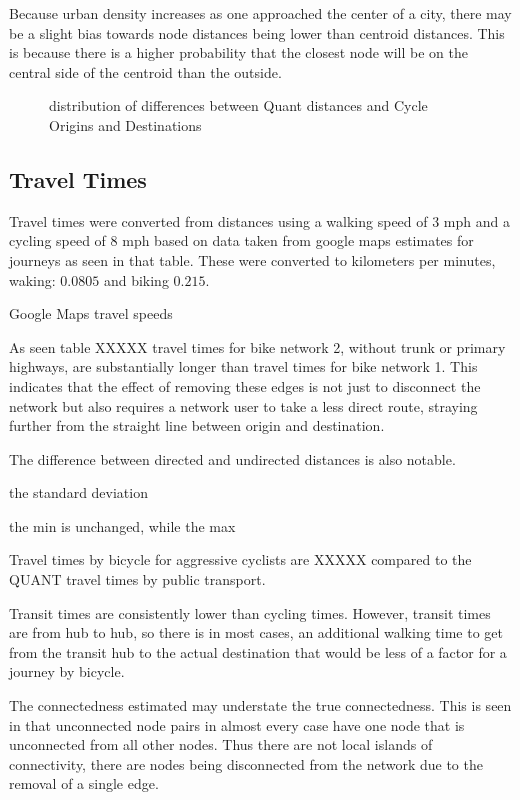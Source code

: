 Because urban density increases as one approached the center of a city, there may be a slight bias towards node distances being lower than centroid distances. This is because there is a higher probability that the closest node will be on the central side of the centroid than the outside. 

\begin{figure}
\centering
\caption{distribution of differences between Quant distances and Cycle Origins and Destinations}
\label{fig:diff_dist}
\end{figure}

\subsection{Travel Times}

Travel times were converted from distances using a walking speed of 3 mph and a cycling speed of 8 mph based on data taken from google maps estimates for journeys as seen in that table. These were converted to kilometers per minutes, waking: $0.0805$ and biking $0.215$. 

\begin{table}
\centering
\caption{Google Maps travel speeds}
\label{table:travel_speeds}
\end{table}

As seen table XXXXX travel times for bike network 2, without trunk or primary highways, are substantially longer than travel times for bike network 1. This indicates that the effect of removing these edges is not just to disconnect the network but also requires a network user to take a less direct route, straying further from the straight line between origin and destination. 

The difference between directed and undirected distances is also notable. 

the standard deviation 

the min is unchanged, while the max 

Travel times by bicycle for aggressive cyclists are XXXXX compared to the QUANT travel times by public transport. 


Transit times are consistently lower than cycling times. However, transit times are from hub to hub, so there is in most cases, an additional walking time to get from the transit hub to the actual destination that would be less of a factor for a journey by bicycle. 


The connectedness estimated may understate the true connectedness. This is seen in that unconnected node pairs in almost every case have one node that is unconnected from all other nodes. Thus there are not local islands of connectivity, there are nodes being disconnected from the network due to the removal of a single edge. 


